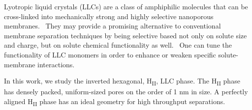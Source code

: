 \documentclass[journal=jctcce,manuscript=article]{achemso}
\begin{document}

  Lyotropic liquid crystals (LLCs) are a class of amphiphilic molecules that
  can be cross-linked into mechanically strong and highly selective nanoporous
  membranes.~\cite{gin_polymerized_2008} They may provide a promising
  alternative to conventional membrane separation techniques by being selective
  based not only on solute size and charge, but on solute chemical
  functionality as well.~\cite{dischinger_application_2017} One can tune the
  functionality of LLC monomers in order to enhance or weaken specific
  solute-membrane interactions.~\cite{dischinger_effect_2017} 

  In this work, we study the inverted hexagonal, H\textsubscript{II}, LLC phase. 
  The H\textsubscript{II} phase has densely packed, uniform-sized pores on the 
  order of 1 nm in size. A perfectly aligned H\textsubscript{II} phase has 
  an ideal geometry for high throughput separations.~\cite{feng_scalable_2014,feng_thin_2016}
\end{document}
